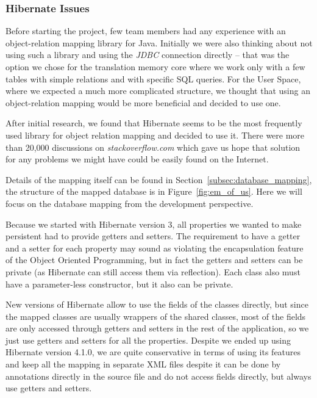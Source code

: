 \subsubsection{Hibernate Issues}

Before starting the project, few team members had any experience with an object-relation mapping library for Java. Initially we were also thinking about not using such a library and using the \emph{JDBC} connection directly -- that was the option we chose for the translation memory core where we work only with a few tables with simple relations and with specific SQL queries. For the User Space, where we expected a much more complicated structure, we thought that using an object-relation mapping would be more beneficial and decided to use one.

After initial research, we found that Hibernate seems to be the most frequently used library for object relation mapping and decided to use it. There were more than 20,000 discussions on \emph{stackoverflow.com} which gave us hope that solution for any problems we might have could be easily found on the Internet. 

Details of the mapping itself can be found in Section~\ref{subsec:database_mapping}, the structure of the mapped database is in Figure~\ref{fig:em_of_us}. Here we will focus on the database mapping from the development perspective.

Because we started with Hibernate version 3, all properties we wanted to make persistent had to provide getters and setters. The requirement to have a getter and a setter for each property may sound as violating the encapsulation feature of the Object Oriented Programming, but in fact the getters and setters can be private (as Hibernate can still access them via reflection). Each class also must have a parameter-less constructor, but it also can be private.

New versions of Hibernate allow to use the fields of the classes directly, but since the mapped classes are usually wrappers of the shared classes, most of the fields are only accessed through getters and setters in the rest of the application, so we just use getters and setters for all the properties. Despite we ended up using Hibernate version 4.1.0, we are quite conservative in terms of using its features and keep all the mapping in separate XML files despite it can be done by annotations directly in the source file and do not access fields directly, but always use getters and setters.

